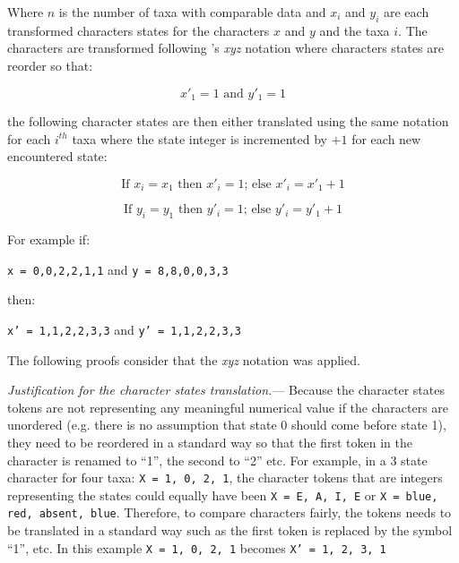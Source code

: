 \documentclass[12pt,letterpaper]{article}
\renewcommand{\subsection}[1]{%
\bigskip
\begin{center}
\begin{large}
\normalfont\itshape #1
\end{large}
\end{center}}
\renewcommand{\subsection}[1]{%
\vspace{2ex}
\noindent
\textit{#1.}---}
\begin{document}
\noindent Where $n$ is the number of taxa with comparable data and $x_i$ and $y_i$ are each transformed characters states for the characters $x$ and $y$ and the taxa $i$.
The characters are transformed following \cite{felsenstein2004inferring}'s \textit{xyz} notation where characters states are reorder so that:

\begin{equation}
x'_1 = 1 \text{ and } y'_1 = 1
\end{equation}

\noindent the following character states are then either translated using the same notation for each $i^{th}$ taxa where the state integer is incremented by $+1$ for each new encountered state:

\begin{equation}
\text{If } x_i = x_1 \text{ then } x'_i = 1 \text{; else } x'_i = x'_1 + 1
\end{equation}

\begin{equation}
\text{If } y_i = y_1 \text{ then } y'_i = 1 \text{; else } y'_i = y'_1 + 1
\end{equation}

\noindent For example if:

\texttt{x = {0,0,2,2,1,1}} and \texttt{y = {8,8,0,0,3,3}}

\noindent then:

\texttt{x' = {1,1,2,2,3,3}} and \texttt{y' = {1,1,2,2,3,3}}


\noindent The following proofs consider that the \textit{xyz} notation was applied.

\subsection{Justification for the character states translation}
Because the character states tokens are not representing any meaningful numerical value if the characters are unordered (e.g. there is no assumption that state 0 should come before state 1), they need to be reordered in a standard way so that the first token in the character is renamed to ``1'', the second to ``2'' etc.
For example, in a 3 state character for four taxa: \texttt{X = {1, 0, 2, 1}}, the character tokens that are integers representing the states could equally have been \texttt{X = {E, A, I, E}} or \texttt{X = {blue, red, absent, blue}}.
Therefore, to compare characters fairly, the tokens needs to be translated in a standard way such as the first token is replaced by the symbol ``1'', etc.
In this example \texttt{X = {1, 0, 2, 1}} becomes \texttt{X' = {1, 2, 3, 1}}
\end{document}
